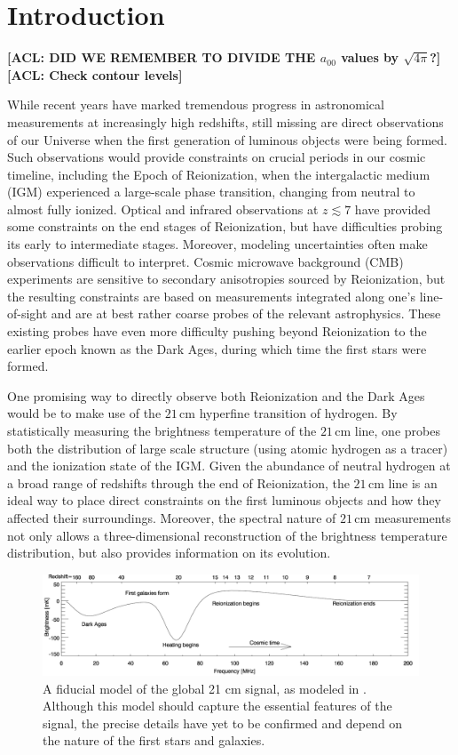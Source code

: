 \documentclass[twolcolumn,apj,iop,numberedappendix]{emulateapj}
\newcommand{\acl}[1]{{\color{red} \textbf{[ACL:  #1]}}}
\begin{document}
\section{Introduction}
\acl{DID WE REMEMBER TO DIVIDE THE $a_{00}$ values by $\sqrt{4\pi}$?}
\acl{Check contour levels}

While recent years have marked tremendous progress in astronomical measurements at increasingly high redshifts, still missing are direct observations of our Universe when the first generation of luminous objects were being formed. Such observations would provide constraints on crucial periods in our cosmic timeline, including the Epoch of Reionization, when the intergalactic medium (IGM) experienced a large-scale phase transition, changing from neutral to almost fully ionized. Optical and infrared observations at $z \lesssim 7$ have provided some constraints on the end stages of Reionization, but have difficulties probing its early to intermediate stages. Moreover, modeling uncertainties often make observations difficult to interpret. Cosmic microwave background (CMB) experiments are sensitive to secondary anisotropies sourced by Reionization, but the resulting constraints are based on measurements integrated along one's line-of-sight and are at best rather coarse probes of the relevant astrophysics. These existing probes have even more difficulty pushing beyond Reionization to the earlier epoch known as the Dark Ages, during which time the first stars were formed.

One promising way to directly observe both Reionization and the Dark Ages would be to make use of the $21\,\textrm{cm}$ hyperfine transition of hydrogen. By statistically measuring the brightness temperature of the $21\,\textrm{cm}$ line, one probes both the distribution of large scale structure (using atomic hydrogen as a tracer) and the ionization state of the IGM. Given the abundance of neutral hydrogen at a broad range of redshifts through the end of Reionization, the $21\,\textrm{cm}$ line is an ideal way to place direct constraints on the first luminous objects and how they affected their surroundings. Moreover, the spectral nature of $21\,\textrm{cm}$ measurements not only allows a three-dimensional reconstruction of the brightness temperature distribution, but also provides information on its evolution.


\begin{figure}[!]
	\centering
	\includegraphics[width=1.00\textwidth]{figures/fidModel.png}
	\caption{A fiducial model of the global 21 cm signal, as modeled in \citet{PritchardLoeb2010}. Although this model should capture the essential features of the signal, the precise details have yet to be confirmed and depend on the nature of the first stars and galaxies.}
	\label{fig:21cmSignal}
\end{figure}
\end{document}
